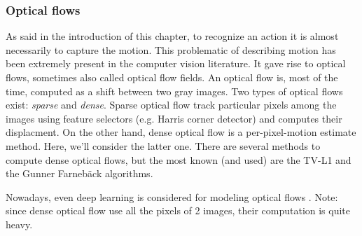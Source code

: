 \documentclass[12pt, a4paper]{report}
\begin{document}
				\subsubsection{Optical flows}
					As said in the introduction of this chapter, to recognize an action it is almost necessarily to capture the motion.
					This problematic of describing motion has been extremely present in the computer vision literature.
					It gave rise to optical flows, sometimes also called optical flow fields.
					An optical flow is, most of the time, computed as a shift between two gray images.
					Two types of optical flows exist: {\itshape sparse} and {\itshape dense}.
					Sparse optical flow track particular pixels among the images using feature selectors (e.g. Harris corner detector) and computes their displacment.
					On the other hand, dense optical flow is a per-pixel-motion estimate method.
					Here, we'll consider the latter one.
					There are several methods to compute dense optical flows, but the most known (and used) are the TV-L1 \cite{perez2013tv} and the Gunner Farnebäck \cite{farneback2003two} algorithms.
					\par
					Nowadays, even deep learning is considered for modeling optical flows \cite{hur2020optical}.
					Note: since dense optical flow use all the pixels of 2 images, their computation is quite heavy.
\end{document}
